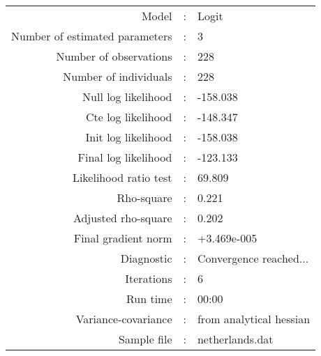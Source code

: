 

\begin{flushleft}
\begin{tabular}{rcl}
\hline
Model &:& Logit\\
Number of estimated parameters&:&3\\
Number of  observations &:& 228\\
Number of individuals&:&228\\
Null log likelihood&:&-158.038\\
Cte log likelihood&:&-148.347\\
Init log likelihood&:&-158.038\\
Final log likelihood&:&-123.133\\
Likelihood ratio test &:&69.809\\
Rho-square&:&0.221\\
Adjusted rho-square&:&0.202\\
Final gradient norm&:&+3.469e-005\\
Diagnostic&:&Convergence reached...\\
Iterations&:&6\\
Run time&:&00:00\\
Variance-covariance&:&from analytical hessian
\\
Sample file&:&netherlands.dat\\
\end{tabular}
\end{flushleft}
